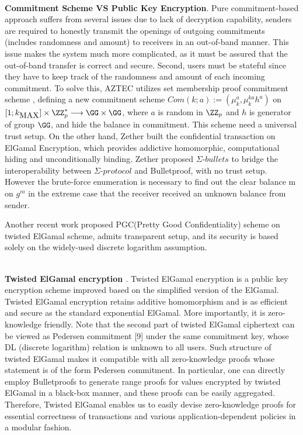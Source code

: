 \documentclass{article}
\begin{document}
~\\
\noindent\noindent\textbf{Commitment Scheme VS Public Key Encryption}. Pure commitment-based approach suffers from several issues due to lack of decryption capability, senders are required to honestly transmit the openings of outgoing commitments (includes randomness and amount) to receivers in an out-of-band manner. This issue makes the system much more complicated, as it must be assured that the out-of-band transfer is correct and secure. Second, users must be stateful since they have to keep track of the randomness and amount of each incoming commitment. To solve this, AZTEC utilizes set membership proof commitment scheme \cite{camenisch2008efficient,arfaoui2015practical}, defining a new commitment scheme $ Com(k; a) := (\mu_k^a, \mu_k^{ka}h^a)$ on $[1; k_{\mbox{MAX}}] \times \ZZ_p^{*} \longrightarrow \GG \times \GG$, where $a$ is random in $\ZZ_p$ and $h$ is generator of group $\GG$, and hide the balance in commitment. This scheme need a universal trust setup.  On the other hand,  Zether built the confidential transaction on ElGamal Encryption\cite{elgamal1985public}, which provides addictive homomorphic, computational hiding and unconditionally binding. Zether proposed $\Sigma\mbox{-}bullets$ to bridge the interoperability between $\Sigma\mbox{-}protocol$ and Bulletproof\cite{bunz2018bulletproofs}, with no trust setup. However the brute-force enumeration is necessary to find out the clear balance m on $g^m$ in the extreme case that the receiver received an unknown balance from sender.

Another recent work \cite{chen2020pgc} proposed PGC(Pretty Good Confidentiality) scheme on twisted ElGamal scheme, admits transparent setup, and its security is based solely on the widely-used discrete logarithm assumption. 

~\\
\noindent\textbf{Twisted ElGamal encryption \cite{chen2020pgc}}. Twisted ElGamal encryption is a public key encryption scheme improved based on the simplified version of the ElGamal. Twisted ElGamal encryption retains additive homomorphism and is as efficient and secure as the standard exponential ElGamal. More importantly, it is zero-knowledge friendly. Note that the second part of twisted ElGamal ciphertext can be viewed as Pedersen commitment [9] under the same commitment key, whose DL (discrete logarithm) relation is unknown to all users. Such structure of twisted ElGamal makes it compatible with all zero-knowledge proofs whose statement is of the form Pedersen commitment. In particular, one can directly employ Bulletproofs\cite{bunz2018bulletproofs} to generate range proofs for values encrypted by twisted ElGamal in a black-box manner, and these proofs can be easily aggregated. Therefore, Twisted ElGamal enables us to easily devise zero-knowledge proofs for essential correctness of transactions and various application-dependent policies in a modular fashion. 
\end{document}
